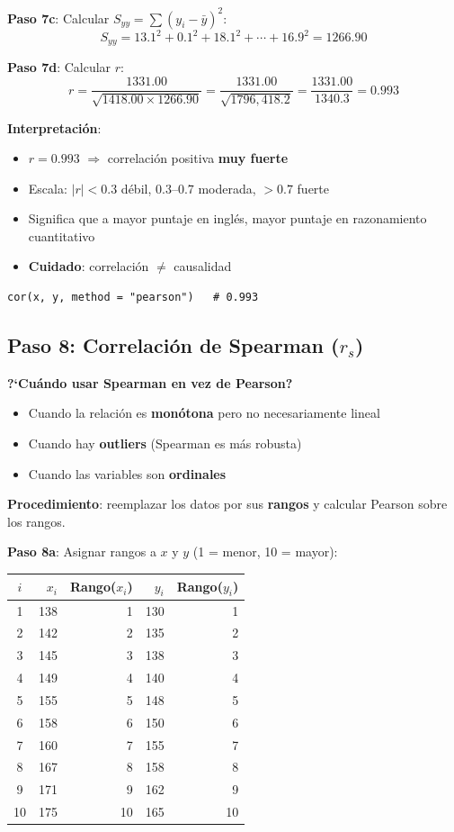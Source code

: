 \documentclass[11pt, a4paper]{article}
\begin{document}
\textbf{Paso 7c}: Calcular $S_{yy} = \sum(y_i - \bar{y})^2$:
\[
S_{yy} = 13.1^2 + 0.1^2 + 18.1^2 + \cdots + 16.9^2 = 1266.90
\]

\textbf{Paso 7d}: Calcular $r$:
\[
r = \frac{1331.00}{\sqrt{1418.00 \times 1266.90}} = \frac{1331.00}{\sqrt{1796,418.2}} = \frac{1331.00}{1340.3} = \boxed{0.993}
\]

\textbf{Interpretaci\'on}:
\begin{itemize}
  \item $r = 0.993$ $\Rightarrow$ correlaci\'on positiva \textbf{muy fuerte}
  \item Escala: $|r| < 0.3$ d\'ebil, $0.3$--$0.7$ moderada, $> 0.7$ fuerte
  \item Significa que a mayor puntaje en ingl\'es, mayor puntaje en razonamiento cuantitativo
  \item \textbf{Cuidado}: correlaci\'on $\neq$ causalidad
\end{itemize}

\begin{lstlisting}
cor(x, y, method = "pearson")   # 0.993
\end{lstlisting}

\subsection{Paso 8: Correlaci\'on de Spearman ($r_s$)}

\textbf{?`Cu\'ando usar Spearman en vez de Pearson?}
\begin{itemize}
  \item Cuando la relaci\'on es \textbf{mon\'otona} pero no necesariamente lineal
  \item Cuando hay \textbf{outliers} (Spearman es m\'as robusta)
  \item Cuando las variables son \textbf{ordinales}
\end{itemize}

\textbf{Procedimiento}: reemplazar los datos por sus \textbf{rangos} y calcular Pearson sobre los rangos.

\textbf{Paso 8a}: Asignar rangos a $x$ y $y$ (1 = menor, 10 = mayor):

\begin{center}
\small
\begin{tabular}{crrrr}
\toprule
$i$ & $x_i$ & Rango($x_i$) & $y_i$ & Rango($y_i$) \\
\midrule
1 & 138 & 1 & 130 & 1 \\
2 & 142 & 2 & 135 & 2 \\
3 & 145 & 3 & 138 & 3 \\
4 & 149 & 4 & 140 & 4 \\
5 & 155 & 5 & 148 & 5 \\
6 & 158 & 6 & 150 & 6 \\
7 & 160 & 7 & 155 & 7 \\
8 & 167 & 8 & 158 & 8 \\
9 & 171 & 9 & 162 & 9 \\
10 & 175 & 10 & 165 & 10 \\
\bottomrule
\end{tabular}
\end{center}
\end{document}
